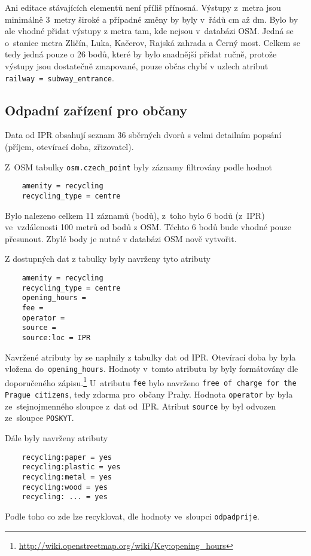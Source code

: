Ani editace stávajících elementů není příliš přínosná. Výstupy
z~metra jsou minimálně 3~metry široké a případné změny by byly v~řádů
cm až dm. Bylo by ale vhodné přidat výstupy z metra tam, kde nejsou
v~databázi OSM. Jedná se o~stanice metra Zličín, Luka, Kačerov, Rajská
zahrada a Černý most. Celkem se tedy jedná pouze o 26 bodů, které by
bylo snadnější přidat ručně, protože výstupy jsou dostatečně zmapované,
pouze občas chybí v uzlech atribut {\tt railway~=~subway\_entrance}.


\subsection{Odpadní zařízení pro občany}
\label{Odpadní zařízení pro občany}
Data od IPR obsahují seznam 36 sběrných dvorů s velmi detailním
popsání (příjem, otevírací doba, zřizovatel). 

Z~OSM tabulky {\tt osm.czech\_point} byly záznamy filtrovány podle
hodnot
\begin{verbatim}
    amenity = recycling
    recycling_type = centre
\end{verbatim}    
Bylo nalezeno celkem 11 záznamů (bodů), z~toho bylo 6 bodů (z~IPR)
ve~vzdálenosti 100 metrů od bodů z OSM. Těchto 6 bodů bude vhodné
pouze přesunout. Zbylé body je nutné v databázi OSM nově vytvořit.

Z dostupných dat z tabulky byly navrženy tyto atributy
\begin{verbatim}
    amenity = recycling
    recycling_type = centre
    opening_hours =
    fee =
    operator =
    source =
    source:loc = IPR
\end{verbatim}
Navržené atributy by se naplnily z tabulky dat od IPR. Otevírací doba
by byla vložena do~{\tt opening\_hours}. Hodnoty v~tomto atributu
by byly formátovány dle doporučeného zápisu.\footnote{\url{http://wiki.openstreetmap.org/wiki/Key:opening\_hours}}
U~atributu {\tt fee} bylo navrženo {\tt free of charge for the Prague citizens}, tedy zdarma pro~občany Prahy. Hodnota
{\tt operator} by byla ze~stejnojmenného sloupce z~dat od~IPR. 
Atribut {\tt source} by byl odvozen ze~sloupce {\tt POSKYT}.

Dále byly navrženy atributy
\begin{verbatim}
    recycling:paper = yes
    recycling:plastic = yes
    recycling:metal = yes
    recycling:wood = yes
    recycling: ... = yes
\end{verbatim}
Podle toho co zde lze recyklovat, dle hodnoty ve~sloupci {\tt odpadprije}.


